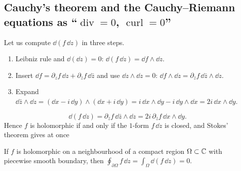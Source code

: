 \subsection{Cauchy's theorem and the Cauchy--Riemann equations as ``$\operatorname{div}=0$, $\operatorname{curl}=0$''}\label{sec:cauchy}

Let us compute $\dd(f\,\dd z)$ in three steps.
\begin{enumerate}
\item Leibniz rule and $\dd(\dd z)=0$: $\dd(f\,\dd z)=\dd f\wedge\dd z$.
\item Insert $\dd f=\partial_zf\,\dd z+\partial_{\bar z}f\,\dd\bar z$ and use $\dd z\wedge\dd z=0$: $\dd f\wedge\dd z=\partial_{\bar z}f\,\dd\bar z\wedge\dd z$.
\item Expand $\dd\bar z\wedge\dd z=(\dd x-i\,\dd y)\wedge(\dd x+i\,\dd y)=i\,\dd x\wedge\dd y-i\,\dd y\wedge\dd x=2i\,\dd x\wedge\dd y$.
\end{enumerate}
\begin{equation}\label{eq:dfdz}
\dd(f\,\dd z)=\partial_{\bar z}f\,\dd\bar z\wedge\dd z=2i\,\partial_{\bar z}f\,\dd x\wedge\dd y .
\end{equation}
Hence $f$ is holomorphic if and only if the $1$-form $f\,\dd z$ is closed, and Stokes' theorem gives at once

\begin{theorem}[Cauchy]\label{thm:cauchy}
If $f$ is holomorphic on a neighbourhood of a compact region $\Omega\subset\mathbb{C}$ with piecewise smooth boundary, then
$\displaystyle\oint_{\partial\Omega}f\,\dd z=\int_\Omega\dd(f\,\dd z)=0.$
\end{theorem}


